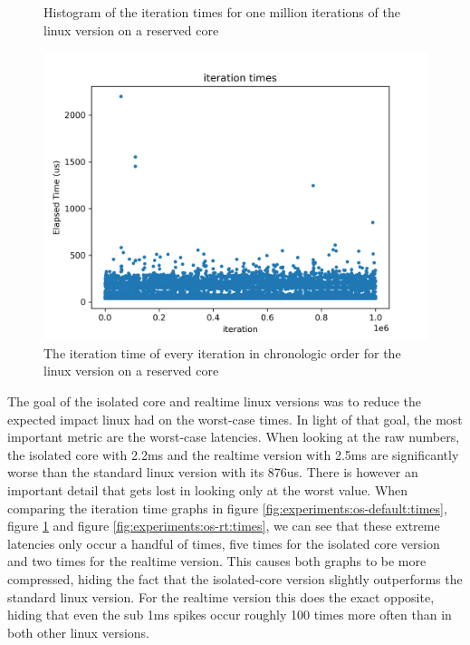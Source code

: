 \begin{figure}[h]
  \begin{center}
    \begin{minipage}{0.48\textwidth}
      \begin{center}
        \caption{Histogram of the iteration times for one million iterations of the linux version on a reserved core}
        \label{fig:experiments:os-isolated:hist}
      \end{center}
    \end{minipage}
    \hspace{0.02\textwidth}
    \begin{minipage}{0.48\textwidth}
      \begin{center}
        \includegraphics[width=\textwidth]{assets/os-isolated/times.png}
        \caption{The iteration time of every iteration in chronologic order for the linux version on a reserved core}
        \label{fig:experiments:os-isolated:times}
      \end{center}
    \end{minipage}
  \end{center}
\end{figure}

The goal of the isolated core and realtime linux versions was to reduce the expected impact linux had on the worst-case times.
In light of that goal, the most important metric are the worst-case latencies.
When looking at the raw numbers,
the isolated core with 2.2ms and the realtime version with 2.5ms are significantly worse than the standard linux version with its 876us.
There is however an important detail that gets lost in looking only at the worst value.
When comparing the iteration time graphs in figure \ref{fig:experiments:os-default:times}, figure \ref{fig:experiments:os-isolated:times} and figure \ref{fig:experiments:os-rt:times},
we can see that these extreme latencies only occur a handful of times, five times for the isolated core version and two times for the realtime version.
This causes both graphs to be more compressed, hiding the fact that the isolated-core version slightly outperforms the standard linux version.
For the realtime version this does the exact opposite, hiding that even the sub 1ms spikes occur roughly 100 times more often than in both other linux versions.

